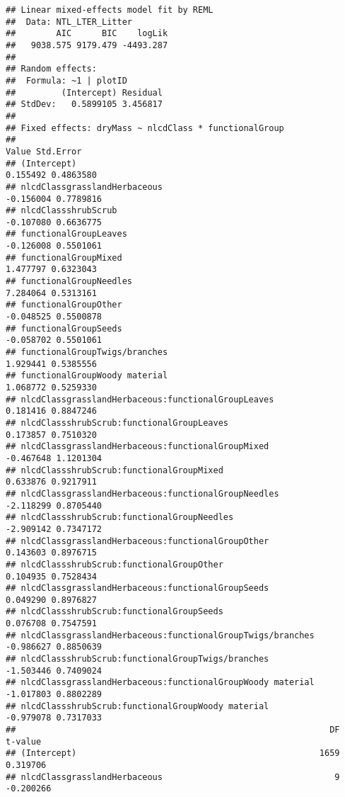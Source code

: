 \documentclass[]{article}
\begin{document}
\begin{verbatim}
## Linear mixed-effects model fit by REML
##  Data: NTL_LTER_Litter 
##        AIC      BIC    logLik
##   9038.575 9179.479 -4493.287
## 
## Random effects:
##  Formula: ~1 | plotID
##         (Intercept) Residual
## StdDev:   0.5899105 3.456817
## 
## Fixed effects: dryMass ~ nlcdClass * functionalGroup 
##                                                                Value Std.Error
## (Intercept)                                                 0.155492 0.4863580
## nlcdClassgrasslandHerbaceous                               -0.156004 0.7789816
## nlcdClassshrubScrub                                        -0.107080 0.6636775
## functionalGroupLeaves                                      -0.126008 0.5501061
## functionalGroupMixed                                        1.477797 0.6323043
## functionalGroupNeedles                                      7.284064 0.5313161
## functionalGroupOther                                       -0.048525 0.5500878
## functionalGroupSeeds                                       -0.058702 0.5501061
## functionalGroupTwigs/branches                               1.929441 0.5385556
## functionalGroupWoody material                               1.068772 0.5259330
## nlcdClassgrasslandHerbaceous:functionalGroupLeaves          0.181416 0.8847246
## nlcdClassshrubScrub:functionalGroupLeaves                   0.173857 0.7510320
## nlcdClassgrasslandHerbaceous:functionalGroupMixed          -0.467648 1.1201304
## nlcdClassshrubScrub:functionalGroupMixed                    0.633876 0.9217911
## nlcdClassgrasslandHerbaceous:functionalGroupNeedles        -2.118299 0.8705440
## nlcdClassshrubScrub:functionalGroupNeedles                 -2.909142 0.7347172
## nlcdClassgrasslandHerbaceous:functionalGroupOther           0.143603 0.8976715
## nlcdClassshrubScrub:functionalGroupOther                    0.104935 0.7528434
## nlcdClassgrasslandHerbaceous:functionalGroupSeeds           0.049290 0.8976827
## nlcdClassshrubScrub:functionalGroupSeeds                    0.076708 0.7547591
## nlcdClassgrasslandHerbaceous:functionalGroupTwigs/branches -0.986627 0.8850639
## nlcdClassshrubScrub:functionalGroupTwigs/branches          -1.503446 0.7409024
## nlcdClassgrasslandHerbaceous:functionalGroupWoody material -1.017803 0.8802289
## nlcdClassshrubScrub:functionalGroupWoody material          -0.979078 0.7317033
##                                                              DF   t-value
## (Intercept)                                                1659  0.319706
## nlcdClassgrasslandHerbaceous                                  9 -0.200266

\end{verbatim}
\end{document}
